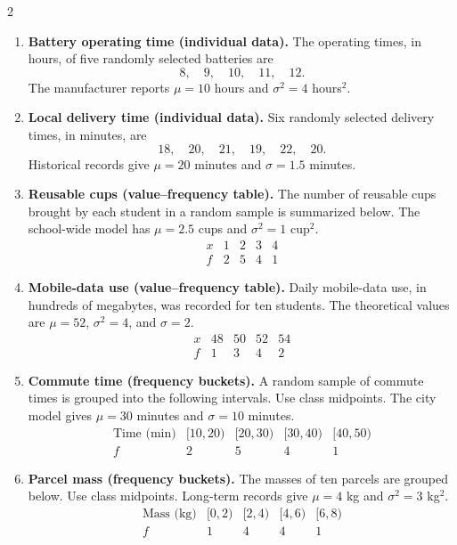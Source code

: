 	\begin{multicols}{2}
		\begin{enumerate}[
			leftmargin=*,
			itemsep=7pt,
			parsep=0pt,
			topsep=4pt
			]
			
			\item
			\textbf{Battery operating time (individual data).}
			The operating times, in hours, of five randomly selected batteries are
			\[
			8,\quad 9,\quad 10,\quad 11,\quad 12.
			\]
			The manufacturer reports $\mu=10$ hours and $\sigma^2=4$ hours$^2$.
			
			\item
			\textbf{Local delivery time (individual data).}
			Six randomly selected delivery times, in minutes, are
			\[
			18,\quad 20,\quad 21,\quad 19,\quad 22,\quad 20.
			\]
			Historical records give $\mu=20$ minutes and $\sigma=1.5$ minutes.
			
			\item
			\textbf{Reusable cups (value--frequency table).}
			The number of reusable cups brought by each student in a random sample is
			summarized below. The school-wide model has $\mu=2.5$ cups and
			$\sigma^2=1$ cup$^2$.
			\[
			\begin{array}{c|cccc}
				x & 1 & 2 & 3 & 4\\ \hline
				f & 2 & 5 & 4 & 1
			\end{array}
			\]
			
			\item
			\textbf{Mobile-data use (value--frequency table).}
			Daily mobile-data use, in hundreds of megabytes, was recorded for ten
			students. The theoretical values are $\mu=52$, $\sigma^2=4$, and $\sigma=2$.
			\[
			\begin{array}{c|cccc}
				x & 48 & 50 & 52 & 54\\ \hline
				f & 1 & 3 & 4 & 2
			\end{array}
			\]
			
			\item
			\textbf{Commute time (frequency buckets).}
			A random sample of commute times is grouped into the following intervals.
			Use class midpoints. The city model gives $\mu=30$ minutes and
			$\sigma=10$ minutes.
			\[
			\begin{array}{c|cccc}
				\text{Time (min)} & [10,20) & [20,30) & [30,40) & [40,50)\\ \hline
				f & 2 & 5 & 4 & 1
			\end{array}
			\]
			
			\item
			\textbf{Parcel mass (frequency buckets).}
			The masses of ten parcels are grouped below. Use class midpoints. Long-term
			records give $\mu=4$ kg and $\sigma^2=3$ kg$^2$.
			\[
			\begin{array}{c|cccc}
				\text{Mass (kg)} & [0,2) & [2,4) & [4,6) & [6,8)\\ \hline
				f & 1 & 4 & 4 & 1
			\end{array}
			\]
			

\end{enumerate}
\end{multicols}
